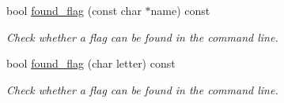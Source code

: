 {\bf }\par
\begin{DoxyCompactItemize}
\item 
bool \hyperlink{class_anyarg_a1305e8be180c7247cb9bdb0994b00597}{found\+\_\+flag} (const char $\ast$name) const 
\begin{DoxyCompactList}\small\item\em Check whether a flag can be found in the command line. \end{DoxyCompactList}\item 
bool \hyperlink{class_anyarg_a8663ada26b0add34878d0929dc436fc5}{found\+\_\+flag} (char letter) const 
\begin{DoxyCompactList}\small\item\em Check whether a flag can be found in the command line. \end{DoxyCompactList}\end{DoxyCompactItemize}

